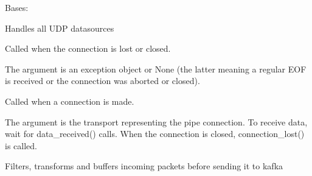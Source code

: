 \documentclass[letterpaper,10pt,english]{sphinxmanual}
\begin{document}
\begin{fulllineitems}
\label{\detokenize{src.datasources:src.datasources.models.UdpReceiver}}
Bases: 

Handles all UDP datasources

\begin{fulllineitems}
\label{\detokenize{src.datasources:src.datasources.models.UdpReceiver.connection_lost}}
Called when the connection is lost or closed.

The argument is an exception object or None (the latter
meaning a regular EOF is received or the connection was
aborted or closed).

\end{fulllineitems}


\begin{fulllineitems}
\label{\detokenize{src.datasources:src.datasources.models.UdpReceiver.connection_made}}
Called when a connection is made.

The argument is the transport representing the pipe connection.
To receive data, wait for data\_received() calls.
When the connection is closed, connection\_lost() is called.

\end{fulllineitems}


\begin{fulllineitems}
\label{\detokenize{src.datasources:src.datasources.models.UdpReceiver.datagram_received}}
Filters, transforms and buffers incoming packets before sending it to kafka


\end{fulllineitems}
\end{fulllineitems}
\end{document}

